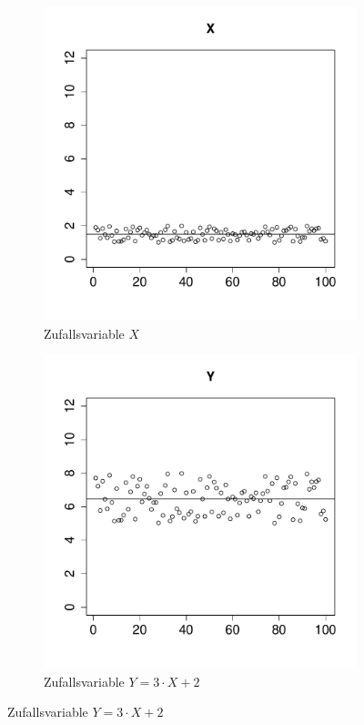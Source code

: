 \begin{figure}[h!]
\centering
\begin{subfigure}[b]{0.48\textwidth}
\includegraphics{verteilungen-050}
\caption{Zufallsvariable $X$}
\end{subfigure}
\begin{subfigure}[b]{0.48\textwidth}
\includegraphics{verteilungen-051}
\caption{Zufallsvariable $Y=3\cdot X +2$}
\end{subfigure}


\end{figure}
